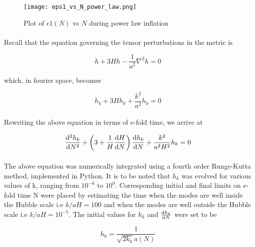 \documentclass[12pt,a4paper,oneside]{book}
\begin{document}
\begin{figure}
\begin{center}
\texttt{[image: eps1\_vs\_N\_power\_law.png]}
\caption[Plot of $\epsilon 1(N)$ vs $N$ during power law inflation]{Plot of $\epsilon 1(N)$ vs $N$ during power law inflation}
\end{center}
\end{figure}

\paragraph*{} Recall that the equation governing the tensor perturbations in the metric is

\begin{equation}
\ddot{h} + 3H\dot{h} - \frac{1}{a^2}\nabla ^2h = 0
\end{equation}

\noindent which, in fourier space, becomes

\begin{equation}
\ddot{h}_k + 3H\dot{h}_k + \frac{k^2}{a^2}h_k = 0
\end{equation}

\paragraph*{} Rewriting the above equation in terms of e-fold time, we arrive at

\begin{equation}
\frac{{\rm d}^2h_k}{{\rm d}N^2} +\left (3+\frac{1}{H}\frac{{\rm d}H}{{\rm d}N}\right)\frac{{\rm d}h_k}{{\rm d}N} + \frac{k^2}{a^2H^2}h_k = 0
\end{equation}

\paragraph*{} The above equation was numerically integrated using a fourth order Runge-Kutta method, implemented in Python. It is to be noted that $h_k$ was evolved for various values of k, ranging from $10^{-6}$ to $10^{0}$. Corresponding initial and final limits on e-fold time N were placed by estimating the time when the modes are well inside the Hubble scale i.e $k/aH =  100$ and when the modes are well outside the Hubble scale i.e $k/aH =  10^{-5}$. The initial values for $h_k$ and $\frac{{\rm d}h_k}{{\rm d}N}$ were set to be

\begin{equation}
h_k  = \frac{1}{\sqrt{2k_0}a(N)}
\end{equation}
\end{document}
